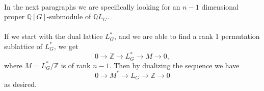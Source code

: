 \documentclass{article}
\theoremstyle{plain}
\newtheorem{proposition}[theorem]{Proposition}
\theoremstyle{definition}
\newcommand{\Z}{\ensuremath{\mathbb{Z}}}
\newcommand{\Q}{\ensuremath{\mathbb{Q}}}
\newcommand*{\QEDA}{\hfill\ensuremath{\blacksquare}}
\begin{document}
\\
In the next paragraphs we are specifically looking for an $n-1$ dimensional proper $\Q[G]$-submodule of $\Q L_G$.\\
\\
If we start with the dual lattice $L^*_G$, and we are able to find a rank 1 permutation sublattice of $L^*_G$, we get 
$$0 \rightarrow \Z  \rightarrow L^*_G \rightarrow M \rightarrow 0,$$ where $M = L^*_G/\Z$ is of rank $n-1$. Then by dualizing the sequence we have $$0 \rightarrow M^*  \rightarrow L_G \rightarrow \Z \rightarrow 0$$ as desired.
\end{document}
